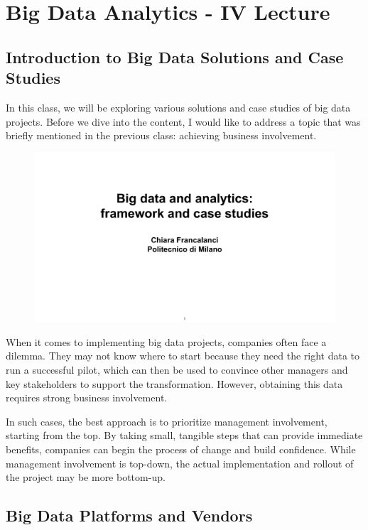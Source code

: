 \section{Big Data Analytics - IV Lecture}

\subsection{Introduction to Big Data Solutions and Case Studies}

In this class, we will be exploring various solutions and case studies
of big data projects. Before we dive into the content, I would like to
address a topic that was briefly mentioned in the previous class:
achieving business involvement.

\begin{figure}[!h]
    \centering
    \includegraphics[page=56, trim = 1.5cm 1cm 1.5cm 1.5cm, clip, width=\textwidth]{images/06 - BIG_DATA.pdf}
\end{figure}

When it comes to implementing big data projects, companies often face a
dilemma. They may not know where to start because they need the right
data to run a successful pilot, which can then be used to convince other
managers and key stakeholders to support the transformation. However,
obtaining this data requires strong business involvement.

In such cases, the best approach is to prioritize management
involvement, starting from the top. By taking small, tangible steps that
can provide immediate benefits, companies can begin the process of
change and build confidence. While management involvement is top-down,
the actual implementation and rollout of the project may be more
bottom-up.

\subsection{Big Data Platforms and Vendors}

